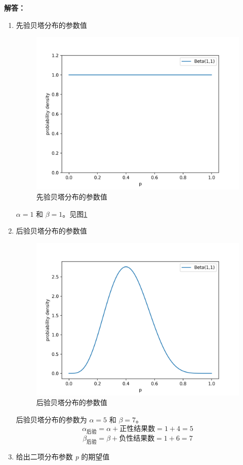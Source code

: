 \documentclass[stu,12pt,floatsintext]{apa7} %
\begin{document}
\textbf{解答：}
\begin{enumerate}[itemsep=2pt,topsep=0pt,parsep=0pt,label=(\alph*)]
    \item 先验贝塔分布的参数值
    
    \begin{figure}
        \centering
        \includegraphics[width=0.6\linewidth]{figure/beta11.png} %
        \caption{先验贝塔分布的参数值} %
        \label{fig:beta11} %
    \end{figure}
    \(\alpha = 1\) 和 \(\beta = 1\)。见图\ref{fig:beta11}

    \item 后验贝塔分布的参数值
    
    \begin{figure}
        \centering
        \includegraphics[width=0.6\linewidth]{figure/beta57.png} 
        \caption{后验贝塔分布的参数值}
        \label{fig:beta57}
    \end{figure}
    后验贝塔分布的参数为 \(\alpha = 5\) 和 \(\beta = 7\)。
    \[
    \alpha_{\text{后验}} = \alpha + \text{正性结果数} = 1 + 4 = 5
    \]
    \[
    \beta_{\text{后验}} = \beta + \text{负性结果数} = 1 + 6 = 7
    \]


    \item 给出二项分布参数 \textit{p} 的期望值
    

\end{enumerate}
\end{document}
